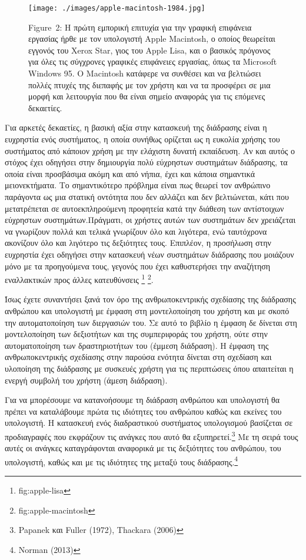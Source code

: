 \documentclass[
]{article}
\begin{document}
\leavevmode{}%
\begin{figure}
\hypertarget{fig:apple-macintosh}{%
\centering
\texttt{[image: ./images/apple-macintosh-1984.jpg]}
\caption{Figure~2: Η πρώτη εμπορική επιτυχία για την γραφική επιφάνεια
εργασίας ήρθε με τον υπολογιστή Apple Macintosh, ο οποίος θεωρείται
εγγονός του Xerox Star, γιος του Apple Lisa, και ο βασικός πρόγονος για
όλες τις σύγχρονες γραφικές επιφάνειες εργασίας, όπως τα Microsoft
Windows 95. O Macintosh κατάφερε να συνθέσει και να βελτιώσει πολλές
πτυχές της διεπαφής με τον χρήστη και να τα προσφέρει σε μια μορφή και
λειτουργία που θα είναι σημείο αναφοράς για τις επόμενες
δεκαετίες.}\label{fig:apple-macintosh}
}
\end{figure}

Για αρκετές δεκαετίες, η βασική αξία στην κατασκευή της διάδρασης είναι
η ευχρηστία ενός συστήματος, η οποία συνήθως ορίζεται ως η ευκολία
χρήσης του συστήματος από κάποιον χρήση με την ελάχιστη δυνατή
εκπαίδευση. Αν και αυτός ο στόχος έχει οδηγήσει στην δημιουργία πολύ
εύχρηστων συστημάτων διάδρασης, τα οποία είναι προσβάσιμα ακόμη και από
νήπια, έχει και κάποια σημαντικά μειονεκτήματα. Το σημαντικότερο
πρόβλημα είναι πως θεωρεί τον ανθρώπινο παράγοντα ως μια στατική
οντότητα που δεν αλλάζει και δεν βελτιώνεται, κάτι που μετατρέπεται σε
αυτοεκπληρούμενη προφητεία κατά την διάθεση των αντίστοιχων εύχρηστων
συστημάτων.Πράγματι, οι χρήστες αυτών των συστημάτων δεν χρειάζεται να
γνωρίζουν πολλά και τελικά γνωρίζουν όλο και λιγότερα, ενώ ταυτόχρονα
ακονίζουν όλο και λιγότερο τις δεξιότητες τους. Επιπλέον, η προσήλωση
στην ευχρηστία έχει οδηγήσει στην κατασκευή νέων συστημάτων διάδρασης
που μοιάζουν μόνο με τα προηγούμενα τους, γεγονός που έχει καθυστερήσει
την αναζήτηση εναλλακτικών προς άλλες κατευθύνσεις \footnote{fig:apple-lisa}
\footnote{fig:apple-macintosh}.

Ίσως έχετε συναντήσει ξανά τον όρο της ανθρωποκεντρικής σχεδίασης της
διάδρασης ανθρώπου και υπολογιστή με έμφαση στη μοντελοποίηση του χρήστη
και με σκοπό την αυτοματοποίηση των διεργασιών του. Σε αυτό το βιβλίο η
έμφαση δε δίνεται στη μοντελοποίηση των δεξιοτήτων και της συμπεριφοράς
του χρήστη, ούτε στην αυτοματοποίηση των δραστηριοτήτων του (έμμεση
διάδραση). Η έμφαση της ανθρωποκεντρικής σχεδίασης στην παρούσα ενότητα
δίνεται στη σχεδίαση και υλοποίηση της διάδρασης με συσκευές χρήστη για
τις περιπτώσεις όπου απαιτείται η ενεργή συμβολή του χρήστη (άμεση
διάδραση).

Για να μπορέσουμε να κατανοήσουμε τη διάδραση ανθρώπου και υπολογιστή θα
πρέπει να καταλάβουμε πρώτα τις ιδιότητες του ανθρώπου καθώς και εκείνες
του υπολογιστή. Η κατασκευή ενός διαδραστικού συστήματος υπολογισμού
βασίζεται σε προδιαγραφές που εκφράζουν τις ανάγκες που αυτό θα
εξυπηρετεί.\footnote{Papanek και Fuller (1972), Thackara (2006)} Με τη
σειρά τους αυτές οι ανάγκες καταγράφονται αναφορικά με τις δεξιότητες
του ανθρώπου, του υπολογιστή, καθώς και με τις ιδιότητες της μεταξύ τους
διάδρασης.\footnote{Norman (2013)}
\end{document}
